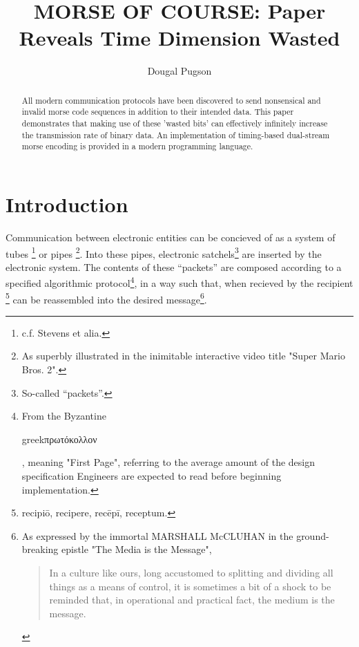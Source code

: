 \documentclass[sigplan]{acmart}
\begin{document}
\title[MORSE OF COURSE: Paper Reveals Time Dimension Wasted]{MORSE OF COURSE: Paper Reveals Time Dimension Wasted}

\author{Dougal Pugson}

\begin{abstract}
All modern communication protocols have been discovered to send
nonsensical and invalid morse code sequences in addition to their
intended data. This paper demonstrates that making use of these
'wasted bits' can effectively infinitely increase the transmission
rate of binary data.
An implementation of timing-based dual-stream morse
encoding is provided in a modern programming language.
\end{abstract}



\maketitle

\section{Introduction}\label{introduction}

Communication between electronic entities can be concieved of as a system
of tubes \footnote{ c.f. Stevens et alia.} or pipes \footnote{ As superbly illustrated in the inimitable
interactive video title "Super Mario Bros. 2".}.
Into these pipes, electronic satchels\footnote{So-called ``packets''.} are inserted
by the electronic system. The contents of these ``packets'' are composed
according to a specified algorithmic protocol\footnote{ From the Byzantine \begin{otherlanguage*}{greek}πρωτόκολλον\end{otherlanguage*}, meaning "First Page",
referring to the average amount of the design specification Engineers are expected to read
before beginning implementation.}, in a way such that, when recieved by the
recipient \footnote{recipiō, recipere, recēpī, receptum.} can be reassembled into
the desired message\footnote{%
As expressed by the immortal MARSHALL McCLUHAN in the ground-breaking epistle
"The Media is the Message",

\begin{quote}
In a culture like ours, long accustomed to splitting and 
dividing all things as a means of control, it is sometimes
a bit of a shock to be reminded that, in operational
and practical fact, the medium is the message.
\end{quote}}.
\end{document}
